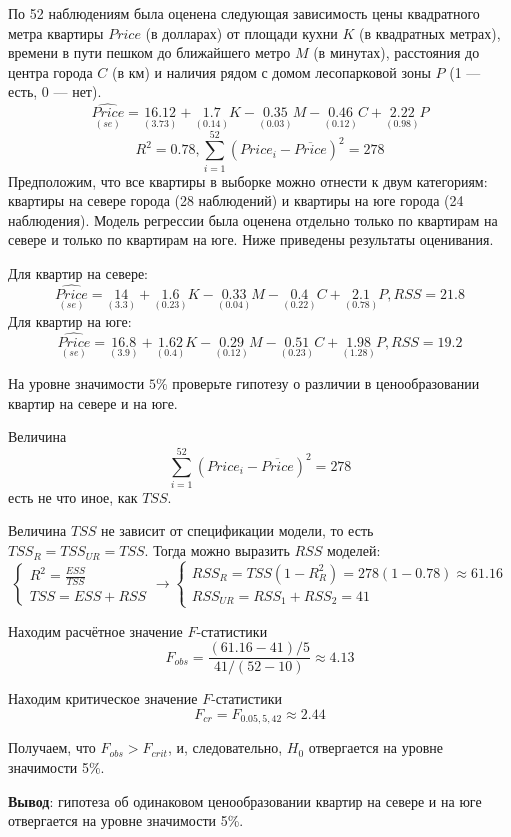\begin{problem} %
 По 52 наблюдениям была оценена следующая зависимость цены квадратного метра квартиры $Price$ (в долларах) от площади кухни $K$ (в квадратных метрах), времени в пути пешком до ближайшего метро $M$ (в минутах), расстояния до центра города $C$ (в км) и наличия рядом с домом лесопарковой зоны $P$ (1 — есть, 0 — нет).
\[
\underset{(se)}{\widehat{Price}}=\underset{(3.73)}{16.12}+\underset{(0.14)}{1.7}K-\underset{(0.03)}{0.35}M-\underset{(0.12)}{0.46}C+\underset{(0.98)}{2.22}P
\]
\[
R^2=0.78, \sum_{i=1}^{52} {(Price_i-\overline{Price})^2}=278
\]
Предположим, что все квартиры в выборке можно отнести к двум категориям: квартиры на севере города (28 наблюдений) и квартиры на юге города (24 наблюдения). Модель регрессии была оценена отдельно только по квартирам на севере и только по квартирам на юге. Ниже приведены результаты оценивания.

Для квартир на севере:
\[
\underset{(se)}{\widehat{Price}}=\underset{(3.3)}{14}+\underset{(0.23)}{1.6}K-\underset{(0.04)}{0.33}M-\underset{(0.22)}{0.4}C+\underset{(0.78)}{2.1}P, RSS=21.8
\]
Для квартир на юге:
\[
\underset{(se)}{\widehat{Price}}=\underset{(3.9)}{16.8}+\underset{(0.4)}{1.62}K-\underset{(0.12)}{0.29}M-\underset{(0.23)}{0.51}C+\underset{(1.28)}{1.98}P, RSS=19.2
\]

На уровне значимости $5\%$ проверьте гипотезу о различии в ценообразовании квартир на севере и на юге.


\begin{sol}
  Величина 
  \[\sum_{i=1}^{52}(Price_i-\overline{Price})^2=278\]
  есть не что иное, как $TSS$. 
  
  Величина $TSS$ не зависит от спецификации модели, то есть $TSS_R=TSS_{UR}=TSS$. 
  Тогда можно выразить $RSS$ моделей:
  \[
  \begin{cases}
  R^2=\frac{ESS}{TSS} \\
  TSS=ESS+RSS
  \end{cases}
  \to
  \begin{cases}
  RSS_R=TSS(1-R^2_R)=278(1-0.78)\approx 61.16\\
  RSS_{UR}=RSS_1+RSS_2=41
  \end{cases}
  \]
  
  Находим расчётное значение $F$-статистики
  \[
  F_{obs}=\frac{(61.16-41)/5}{41/(52-10)}\approx 4.13
  \]
  
  Находим критическое значение $F$-статистики
  \[
  F_{cr}= F_{0.05,5,42}\approx 2.44
  \]
  
  Получаем, что $F_{obs}>F_{crit}$, и, следовательно, $H_0$ отвергается на уровне значимости 5\%.
  
  
  \textbf{Вывод}: гипотеза об одинаковом ценообразовании квартир на севере и на юге отвергается на уровне значимости 5\%.
\end{sol}
\end{problem}



